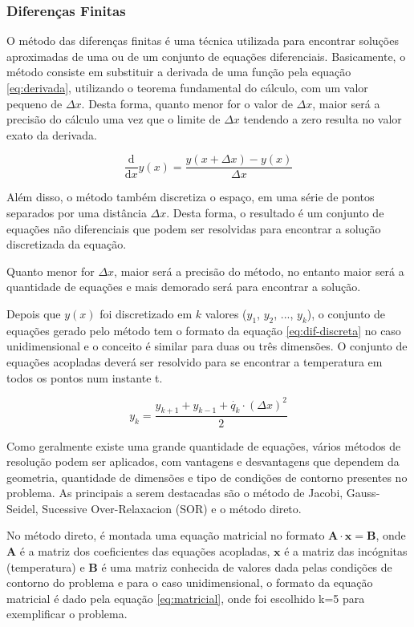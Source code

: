 \subsubsection{Diferenças Finitas}

O método das diferenças finitas é uma técnica utilizada para encontrar soluções aproximadas de uma ou de um conjunto de equações diferenciais. Basicamente, o método consiste em substituir a derivada de uma função pela equação \ref{eq:derivada}, utilizando o teorema fundamental do cálculo, com um valor pequeno de $\Delta x$. Desta forma, quanto menor for o valor de $\Delta x$, maior será a precisão do cálculo uma vez que o limite de $\Delta x$ tendendo a zero resulta no valor exato da derivada. 

\begin{equation}\label{eq:derivada}
\frac{\mathrm{d} }{\mathrm{d} x}y(x) = \frac{y(x + \Delta x) - y(x)}{\Delta x}
\end{equation}

Além disso, o método também discretiza o espaço, em uma série de pontos separados por uma distância $\Delta x$. Desta forma, o resultado é um conjunto de equações não diferenciais que podem ser resolvidas para encontrar a solução discretizada da equação.

Quanto menor for $\Delta x$, maior será a precisão do método, no entanto maior será a quantidade de equações e mais demorado será para encontrar a solução.

Depois que $y(x)$ foi discretizado em $k$ valores ($y_1$, $y_2$, ..., $y_k$), o conjunto de equações gerado pelo método tem o formato da equação \ref{eq:dif-discreta} no caso unidimensional e o conceito é similar para duas ou três dimensões. O conjunto de equações acopladas deverá ser resolvido para se encontrar a temperatura em todos os pontos num instante t. 

\begin{equation}\label{eq:dif-discreta}
y_k = \frac{y_{k+1} + y_{k-1} + \dot{q_k} \cdot (\Delta x)^2}{2}
\end{equation}

Como geralmente existe uma grande quantidade de equações, vários métodos de resolução podem ser aplicados, com vantagens e desvantagens que dependem da geometria, quantidade de dimensões e tipo de condições de contorno presentes no problema. As principais a serem destacadas são o método de Jacobi, Gauss-Seidel, Sucessive Over-Relaxacion (SOR) e o método direto. 

No método direto, é montada uma equação matricial no formato $ \mathbf{A} \cdot \mathbf{x} = \mathbf{B}$, onde $\mathbf{A}$ é a matriz dos coeficientes das equações acopladas, $\mathbf{x}$ é a matriz das incógnitas (temperatura) e $\mathbf{B}$ é uma matriz conhecida de valores dada pelas condições de contorno do problema e para o caso unidimensional, o formato da equação matricial é dado pela equação \ref{eq:matricial}, onde foi escolhido k=5 para exemplificar o problema. 

